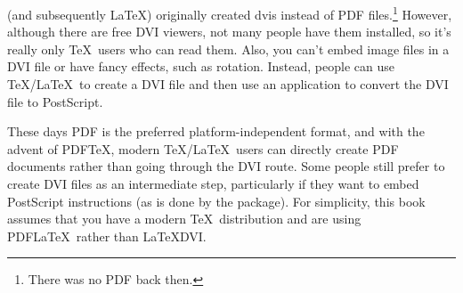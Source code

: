  (and subsequently \LaTeX) originally created \glspl*{dvi} 
instead of PDF files.\footnote{There was no PDF
back then.} However, although there are free DVI viewers, not many
people have them installed, so it's really only \TeX\ users who
can read them. Also, you can't embed image files in a DVI file or
have fancy effects, such as rotation. Instead, people can use
\TeX\slash \LaTeX\ to create
a DVI file and then use an application to convert the DVI file to
PostScript.

These days PDF is the preferred platform-independent format, and
with the advent of PDF\TeX, modern \TeX\slash \LaTeX\ users can
directly create PDF documents rather than going through the DVI
route. Some people still prefer to create DVI files as an
intermediate step, particularly if they want to embed PostScript
instructions (as is done by the  package). For
simplicity, this book assumes that you have a modern \TeX\
distribution and are using PDF\LaTeX\ rather than \LaTeX\TO DVI.
